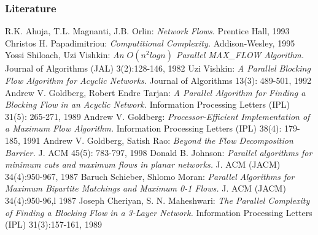 \documentclass{beamer}
\begin{document}
\begin{frame}[allowframebreaks]
\frametitle<presentation>{Literature}    
\begin{thebibliography}{10}    
	 R.K. Ahuja, T.L. Magnanti, J.B. Orlin:
    \emph{Network Flows.} 
    Prentice Hall, 1993
    Christos H. Papadimitriou:
    \emph{Computitional Complexity.} 
    Addison-Wesley, 1995
    Yossi Shiloach, Uzi Vishkin:
    \emph{An $O(n^{2}log n)$ Parallel MAX\_FLOW Algorithm.} 
    Journal of Algorithms (JAL) 3(2):128-146, 1982
    Uzi Vishkin:
    \emph{A Parallel Blocking Flow Algorithm for Acyclic Networks.} 
    Journal of Algorithms 13(3): 489-501, 1992
    Andrew V. Goldberg, Robert Endre Tarjan:
    \emph{A Parallel Algorithm for Finding a Blocking Flow in an Acyclic Network.} 
    Information Processing Letters (IPL) 31(5): 265-271, 1989
    Andrew V. Goldberg:
    \emph{Processor-Efficient Implementation of a Maximum Flow Algorithm.}
    Information Processing Letters (IPL) 38(4): 179-185, 1991
    Andrew V. Goldberg, Satish Rao: 
    \emph{Beyond the Flow Decomposition Barrier.}
    J. ACM 45(5): 783-797, 1998
	Donald B. Johnson:
    \emph{Parallel algorithms for minimum cuts and maximum flows in planar networks.}
    J. ACM (JACM) 34(4):950-967, 1987
    Baruch Schieber, Shlomo Moran:
    \emph{Parallel Algorithms for Maximum Bipartite Matchings and Maximum 0-1 Flows.}
    J. ACM (JACM) 34(4):950-96,l 1987
	Joseph Cheriyan, S. N. Maheshwari:
	\emph{The Parallel Complexity of Finding a Blocking Flow in a 3-Layer Network.}
	Information Processing Letters (IPL) 31(3):157-161, 1989  	
\end{thebibliography}
\end{frame} 	 
 	 
\end{document}
